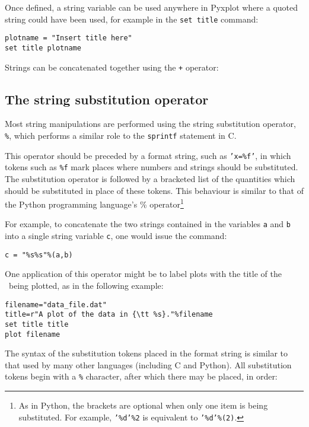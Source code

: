 Once defined, a string variable can be used anywhere in Pyxplot where a quoted
string could have been used, for example in the {\tt set title} command:

\begin{verbatim}
plotname = "Insert title here"
set title plotname
\end{verbatim}

Strings can be concatenated together using the {\tt +} operator:

\vspace{3mm}

\vspace{3mm}

\subsection{The string substitution operator}
\label{sec:stringsubop}

Most string manipulations are performed using the string substitution operator,
{\tt \%}, which performs a similar role to
the {\tt sprintf} statement in C.

This operator should be preceded by a format string, such as {\tt 'x=\%f'}, in
which tokens such as {\tt \%f} mark places where numbers and strings should be
substituted. The substitution operator is followed by a bracketed list of the
quantities which should be substituted in place of these tokens. This behaviour
is similar to that of the Python programming language's \% operator\footnote{As
in Python, the brackets are optional when only one item is being substituted.
For example, {\tt '\%d'\%2} is equivalent to {\tt '\%d'\%(2)}.}

For example, to concatenate the two strings contained in the variables {\tt a}
and {\tt b} into a single string variable {\tt c}, one would issue the
command:

\begin{verbatim}
c = "%s%s"%(a,b)
\end{verbatim}

One application of this operator might be to label plots with the title of the
\datafile\ being plotted, as in the following example:
\begin{verbatim}
filename="data_file.dat"
title=r"A plot of the data in {\tt %s}."%filename
set title title
plot filename
\end{verbatim}

The syntax of the substitution tokens placed in the format string is similar to
that used by many other languages (including C and Python).  All substitution
tokens begin with a {\tt \%} character, after which there may be placed, in
order:

